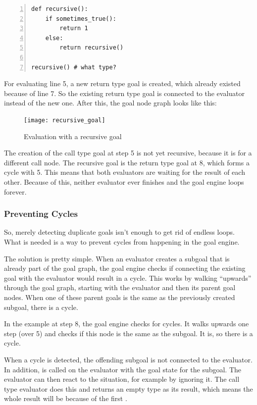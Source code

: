 \documentclass[12pt,halfparskip,DIV11,BCOR10mm]{scrreprt}
\begin{document}
\begin{lstlisting}[numbers=left]
def recursive():
    if sometimes_true():
        return 1
    else:
        return recursive()

recursive() # what type?
\end{lstlisting}

For evaluating line 5, a new return type goal is created, which already existed because of line 7. So the existing return type goal is connected to the evaluator instead of the new one. After this, the goal node graph looks like this:

\begin{figure}[H]
	\centering
	\texttt{[image: recursive\_goal]}
	\label{fig:recursive_goal}
	\caption{Evaluation with a recursive goal}
\end{figure}

The creation of the call type goal at step 5 is not yet recursive, because it is for a different call node. The recursive goal is the return type goal at 8, which forms a cycle with 5. This means that both evaluators are waiting for the result of each other. Because of this, neither evaluator ever finishes and the goal engine loops forever.

\subsubsection{Preventing Cycles}

So, merely detecting duplicate goals isn't enough to get rid of endless loops. What is needed is a way to prevent cycles from happening in the goal engine.

The solution is pretty simple. When an evaluator creates a subgoal that is already part of the goal graph, the goal engine checks if connecting the existing goal with the evaluator would result in a cycle. This works by walking ``upwards'' through the goal graph, starting with the evaluator and then its parent goal nodes. When one of these parent goals is the same as the previously created subgoal, there is a cycle.

In the example at step 8, the goal engine checks for cycles. It walks upwards one step (over 5) and checks if this node is the same as the subgoal. It is, so there is a cycle.

When a cycle is detected, the offending subgoal is not connected to the evaluator. In addition,  is called on the evaluator with the  goal state for the subgoal. The evaluator can then react to the situation, for example by ignoring it. The call type evaluator does this and returns an empty type as its result, which means the whole result will be  because of the first .
\end{document}
